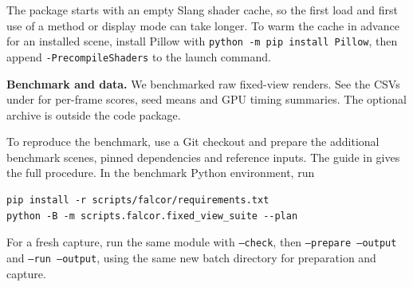 \documentclass[a4paper,twocolumn]{article}
\begin{document}
The package starts with an empty Slang shader cache, so the first load and first use of a method or display mode can take longer. To warm the cache in advance for an installed scene, install Pillow with \texttt{python -m pip install Pillow}, then append \texttt{-PrecompileShaders} to the launch command.

\textbf{Benchmark and data.} We benchmarked raw fixed-view renders. See the CSVs under  for per-frame scores, seed means and GPU timing summaries. The optional  archive is outside the code package.

To reproduce the benchmark, use a Git checkout and prepare the additional benchmark scenes, pinned dependencies and reference inputs. The guide in  gives the full procedure. In the benchmark Python environment, run
{\footnotesize
\begin{verbatim}
pip install -r scripts/falcor/requirements.txt
python -B -m scripts.falcor.fixed_view_suite --plan
\end{verbatim}
}
For a fresh capture, run the same module with \texttt{--check}, then \texttt{--prepare --output} and \texttt{--run --output}, using the same new batch directory for preparation and capture.
\end{document}
